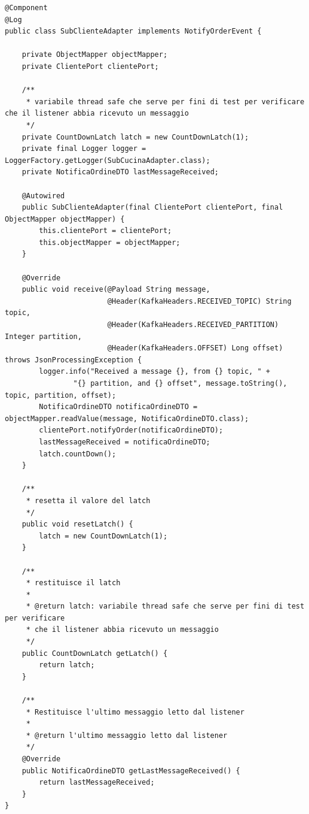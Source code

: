 \begin{lstlisting}[style=myJava, 
    caption={Classe del consumer kafka SubClienteAdapter.java}, label=lst:subclienteadapter, 
    emph={[2] kafkaTemplate , objectMapper, topic, payload, log, producer, embeddedKafka, logger, testAppender, RECEIVED_TOPIC, RECEIVED_PARTITION, OFFSET, clientePort, lastMessageReceived, latch,  },
    emphstyle={[2]\color{codeDarkMagenta}}]
@Component
@Log
public class SubClienteAdapter implements NotifyOrderEvent {

    private ObjectMapper objectMapper;
    private ClientePort clientePort;

    /**
     * variabile thread safe che serve per fini di test per verificare che il listener abbia ricevuto un messaggio
     */
    private CountDownLatch latch = new CountDownLatch(1);
    private final Logger logger = LoggerFactory.getLogger(SubCucinaAdapter.class);
    private NotificaOrdineDTO lastMessageReceived;

    @Autowired
    public SubClienteAdapter(final ClientePort clientePort, final ObjectMapper objectMapper) {
        this.clientePort = clientePort;
        this.objectMapper = objectMapper;
    }

    @Override
    public void receive(@Payload String message,
                        @Header(KafkaHeaders.RECEIVED_TOPIC) String topic,
                        @Header(KafkaHeaders.RECEIVED_PARTITION) Integer partition,
                        @Header(KafkaHeaders.OFFSET) Long offset) throws JsonProcessingException {
        logger.info("Received a message {}, from {} topic, " +
                "{} partition, and {} offset", message.toString(), topic, partition, offset);
        NotificaOrdineDTO notificaOrdineDTO = objectMapper.readValue(message, NotificaOrdineDTO.class);
        clientePort.notifyOrder(notificaOrdineDTO);
        lastMessageReceived = notificaOrdineDTO;
        latch.countDown();
    }

    /**
     * resetta il valore del latch
     */
    public void resetLatch() {
        latch = new CountDownLatch(1);
    }

    /**
     * restituisce il latch
     *
     * @return latch: variabile thread safe che serve per fini di test per verificare
     * che il listener abbia ricevuto un messaggio
     */
    public CountDownLatch getLatch() {
        return latch;
    }

    /**
     * Restituisce l'ultimo messaggio letto dal listener
     *
     * @return l'ultimo messaggio letto dal listener
     */
    @Override
    public NotificaOrdineDTO getLastMessageReceived() {
        return lastMessageReceived;
    }
}
\end{lstlisting}
